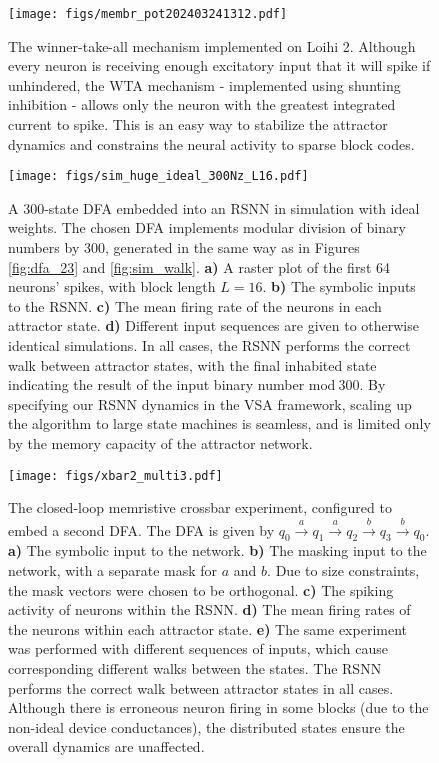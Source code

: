 \begin{figure}
    \centering
    \texttt{[image: figs/membr\_pot202403241312.pdf]}
    \caption{The winner-take-all mechanism implemented on Loihi 2. Although every neuron is receiving enough excitatory input that it will spike if unhindered, the WTA mechanism - implemented using shunting inhibition - allows only the neuron with the greatest integrated current to spike. This is an easy way to stabilize the attractor dynamics and constrains the neural activity to sparse block codes.}
    \label{fig:loihi_wta}
\end{figure}

\begin{figure}
    \centering
    \texttt{[image: figs/sim\_huge\_ideal\_300Nz\_L16.pdf]}
    \caption{A 300-state DFA embedded into an RSNN in simulation with ideal weights. The chosen DFA implements modular division of binary numbers by 300, generated in the same way as in Figures \ref{fig:dfa_23} and \ref{fig:sim_walk}. \textbf{a)} A raster plot of the first 64 neurons' spikes, with block length $L = 16$. \textbf{b)} The symbolic inputs to the RSNN. \textbf{c)} The mean firing rate of the neurons in each attractor state. \textbf{d)} Different input sequences are given to otherwise identical simulations. In all cases, the RSNN performs the correct walk between attractor states, with the final inhabited state indicating the result of the input binary number $\mathrm{mod} \ 300$. By specifying our RSNN dynamics in the VSA framework, scaling up the algorithm to large state machines is seamless, and is limited only by the memory capacity of the attractor network.}
    \label{fig:sim_huge_dfa_results}
\end{figure}


\begin{figure}
    \centering
    \texttt{[image: figs/xbar2\_multi3.pdf]}
    \caption{The closed-loop memristive crossbar experiment, configured to embed a second DFA. The DFA is given by $q_0 \overset{a}{\rightarrow} q_1 \overset{a}{\rightarrow} q_2 \overset{b}{\rightarrow} q_3 \overset{b}{\rightarrow} q_0$. \textbf{a)} The symbolic input to the network. \textbf{b)} The masking input to the network, with a separate mask for $a$ and $b$. Due to size constraints, the mask vectors were chosen to be orthogonal.  \textbf{c)} The spiking activity of neurons within the RSNN. \textbf{d)} The mean firing rates of the neurons within each attractor state. \textbf{e)} The same experiment was performed with different sequences of inputs, which cause corresponding different walks between the states. The RSNN performs the correct walk between attractor states in all cases. Although there is erroneous neuron firing in some blocks (due to the non-ideal device conductances), the distributed states ensure the overall dynamics are unaffected.}
    \label{fig:xbar_bigger}
\end{figure}

